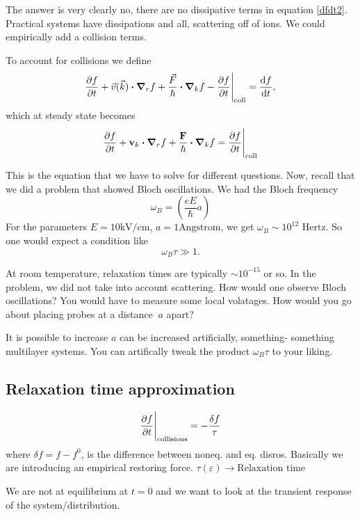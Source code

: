 \documentclass[a4paper]{article}
\newcommand{\hcut}{\hbar}
\begin{document}
The answer is very clearly no, there are no dissipative terms in
equation \ref{dfdt2}. Practical systems have dissipations and all,
scattering off of ions. We could empirically add a collision terms.

To account for collisions we define
\begin{equation}
	\pdv{f}{t} + \vec{v}(\vec{k})\vdot\grad_rf + \frac{\vec{F}}{\hbar}\vdot\grad_k f - \pdv{f}{t}\Bigg|_\text{coll} = \frac{\dd f}{\dd t},
\end{equation}
which at steady state becomes
\begin{equation}
	\label{sstate}
	\pdv{f}{t} + \mathbf{v}_k \vdot \grad_r f + \frac{\textbf{F}}{\hcut}\vdot\grad_k f = \pdv{f}{t}\Bigg|_\text{coll}
\end{equation}

This is the equation that we have to solve for different questions.
Now, recall that we did a problem that showed Bloch oscillations.
We had the Bloch frequency
\begin{equation}
	\omega_B = \left( \frac{eE}{\hbar} a\right) 
\end{equation}
For the parameters $E = 10\text{kV/cm}$,  $a = 1\text{Angstrom}$, we
get  $\omega_B \sim 10^{12} \text{ Hertz}$. So one would expect a
condition like
\[
\omega_B \tau \gg 1
.\] 

At room temperature, relaxation times are typically $\sim 10^{-15}$
or so. In the problem, we did not take into account scattering.
How would one observe Bloch oscillations? You would have to measure
some local volatages. How would you go about placing probes at a
distance $~a$ apart?

It is possible to increase  $a$ can be increased artificially, something-
something multilayer systems. You can artifically tweak the product
$\omega_B \tau$ to your liking.

\subsection*{Relaxation time approximation}
\begin{equation}
	\pdv{f}{t}\Bigg|_\text{collisions} = -\frac{\delta f}{\tau}
\end{equation}
where $\delta f = f - f^{0}$, is the difference between noneq. and 
eq. disros. Basically we are introducing an empirical restoring force. $\tau(\varepsilon) \to \text{Relaxation time}$

We are not at equilibrium at $t=0$ and we want to look at the transient
response of the system/distribution.
\end{document}
